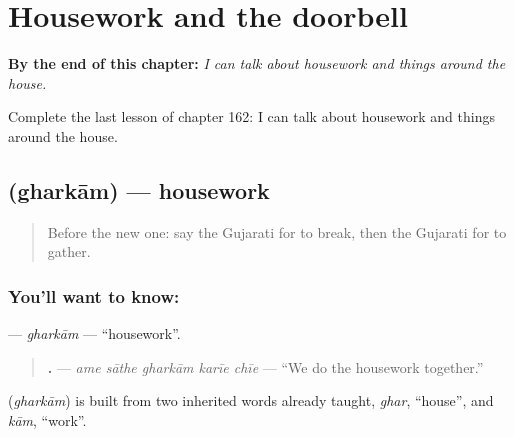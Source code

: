 
\chapter{Housework and the doorbell}
\label{ch:gu-housework-and-the-doorbell}

\begin{chapteropening}
\textbf{By the end of this chapter:} \emph{I can talk about housework and things around the house.}

Complete the last lesson of chapter 162: I can talk about housework and things around the house.
\end{chapteropening}

\section[\texorpdfstring{\gu{ઘરકામ} (gharkām)}{ઘરકામ (gharkām)}]{ (gharkām) — housework}

\label{lesson:GU-C162-gharkam}



\begin{quote}
Before the new one: say the Gujarati for to break, then the Gujarati for to gather.
\end{quote}

\subsection*{You'll want to know: }
\textbf{} — \emph{gharkām} — \textquotedblleft{}housework\textquotedblright{}.

\begin{quote}
\textbf{    .} — \emph{ame sāthe gharkām karīe chīe} — \textquotedblleft{}We do the housework together.\textquotedblright{}
\end{quote}

\begin{cousinweb}
\textbf{} (\emph{gharkām}) is built from two inherited words already taught, \emph{ghar}, \textquotedblleft{}house\textquotedblright{}, and \emph{kām}, \textquotedblleft{}work\textquotedblright{}.
\end{cousinweb}

